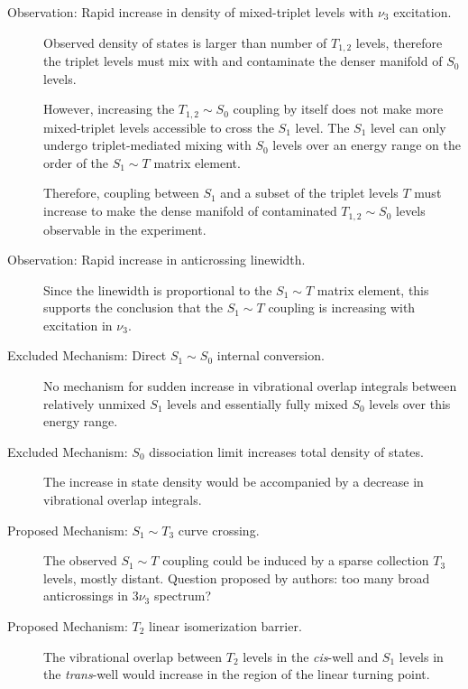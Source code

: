 \documentclass[12pt]{mitthesis}
\begin{document}
\begin{description}
\item[Observation: Rapid increase in density of mixed-triplet levels
  with $\nu_3$ excitation.]  Observed density of states is larger than
  number of $T_{1,2}$ levels, therefore the triplet levels must mix
  with and contaminate the denser manifold of $S_0$ levels.

  However, increasing the $T_{1,2} \sim S_0$ coupling by itself does
  not make more mixed-triplet levels accessible to cross the $S_1$
  level.  The $S_1$ level can only undergo triplet-mediated mixing
  with $S_0$ levels over an energy range on the order of the $S_1 \sim
  T$ matrix element.

  Therefore, coupling between $S_1$ and a subset of the triplet levels
  $T$ must increase to make the dense manifold of contaminated
  $T_{1,2} \sim S_0$ levels observable in the experiment.

\item[Observation: Rapid increase in anticrossing linewidth.]  Since
  the linewidth is proportional to the $S_1 \sim T$ matrix element,
  this supports the conclusion that the $S_1 \sim T$ coupling is
  increasing with excitation in $\nu_3$.

\item[Excluded Mechanism: Direct $S_1 \sim S_0$ internal conversion.]
  No mechanism for sudden increase in vibrational overlap integrals
  between relatively unmixed $S_1$ levels and essentially fully mixed
  $S_0$ levels over this energy range.

\item[Excluded Mechanism: $S_0$ dissociation limit increases total
  density of states.]  The increase in state density would be
  accompanied by a decrease in vibrational overlap integrals.

\item[Proposed Mechanism: $S_1 \sim T_3$ curve crossing.]  The
  observed $S_1 \sim T$ coupling could be induced by a sparse
  collection $T_3$ levels, mostly distant.  Question proposed by
  authors: too many broad anticrossings in $3\nu_3$ spectrum?

\item[Proposed Mechanism: $T_2$ linear isomerization barrier.]  The
  vibrational overlap between $T_2$ levels in the \emph{cis}-well and
  $S_1$ levels in the \emph{trans}-well would increase in the region
  of the linear turning point.
\end{description}
\end{document}
